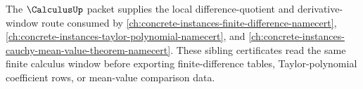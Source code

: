 The $\CalculusUp$ packet supplies the local difference-quotient and derivative-window route consumed by \autoref{ch:concrete-instances-finite-difference-namecert}, \autoref{ch:concrete-instances-taylor-polynomial-namecert}, and \autoref{ch:concrete-instances-cauchy-mean-value-theorem-namecert}. These sibling certificates read the same finite calculus window before exporting finite-difference tables, Taylor-polynomial coefficient rows, or mean-value comparison data.
